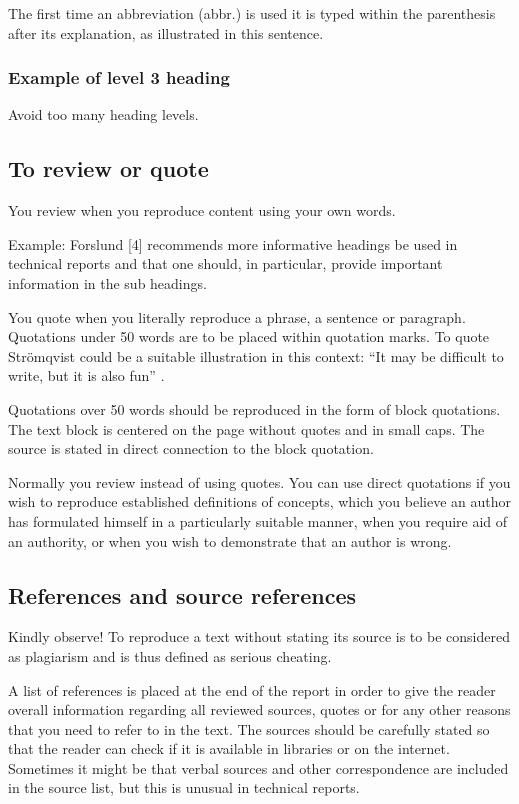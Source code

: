 The first time an abbreviation (abbr.) is used it is typed within the parenthesis after its explanation, as illustrated in this sentence.

\subsubsection{Example of level 3 heading}
\label{ch:theory:level3-heading}
Avoid too many heading levels.

\subsection{To review or quote}
\label{ch:theory:review:quote}
You review when you reproduce content using your own words.

Example: Forslund [4] recommends more informative headings be used in technical reports and that one should, in particular, provide important information in the sub headings.

You quote when you literally reproduce a phrase, a sentence or paragraph. Quotations under 50 words are to be placed within quotation marks. To quote Strömqvist could be a suitable illustration in this context: “It may be difficult to write, but it is also fun” \cite{stomquist}.

Quotations over 50 words should be reproduced in the form of block quotations. The text block is centered on the page without quotes and in small caps. The source is stated in direct connection to the block quotation.

Normally you review instead of using quotes. You can use direct quotations if you wish to reproduce established definitions of concepts, which you believe an author has formulated himself in a particularly suitable manner, when you require aid of an authority, or when you wish to demonstrate that an author is wrong.

\subsection{References and source references}
Kindly observe! To reproduce a text without stating its source is to be considered as plagiarism and is thus defined as serious cheating.

A list of references is placed at the end of the report in order to give the reader overall information regarding all reviewed sources, quotes or for any other reasons that you need to refer to in the text. The sources should be carefully stated so that the reader can check if it is available in libraries or on the internet. Sometimes it might be that verbal sources and other correspondence are included in the source list, but this is unusual in technical reports.

